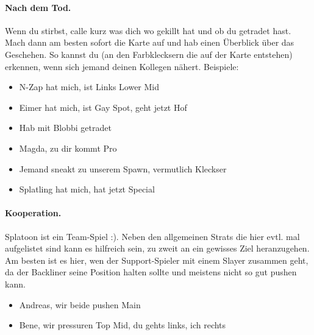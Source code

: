 \documentclass{scrreprt}
\begin{document}
\paragraph{Nach dem Tod.} Wenn du stirbst, calle kurz was dich wo gekillt hat und ob du getradet hast. Mach dann am besten sofort die Karte auf und hab einen Überblick über das Geschehen. So kannst du (an den Farbklecksern die auf der Karte entstehen) erkennen, wenn sich jemand deinen Kollegen nähert. 
Beispiele: 
\begin{itemize}
	\item N-Zap hat mich, ist Links Lower Mid
	\item Eimer hat mich, ist Gay Spot, geht jetzt Hof
	\item Hab mit Blobbi getradet
	\item Magda, zu dir kommt Pro
	\item Jemand sneakt zu unserem Spawn, vermutlich Kleckser
	\item Splatling hat mich, hat jetzt Special
\end{itemize}
\paragraph{Kooperation.} Splatoon ist ein Team-Spiel :). Neben den allgemeinen Strats die hier evtl. mal aufgelistet sind kann es hilfreich sein, zu zweit an ein gewisses Ziel heranzugehen. Am besten ist es hier, wen der Support-Spieler mit einem Slayer zusammen geht, da der Backliner seine Position halten sollte und meistens nicht so gut pushen kann.
\begin{itemize}
	\item Andreas, wir beide pushen Main
	\item Bene, wir pressuren Top Mid, du gehts links, ich rechts
	\end{itemize}
\end{document}
